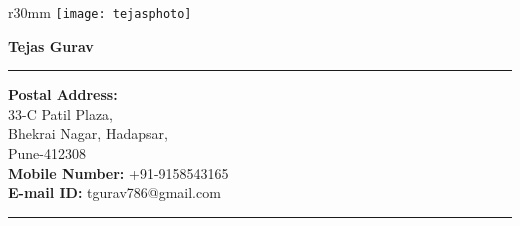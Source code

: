 \documentclass{article}
\begin{document}
	
	\begin{wrapfigure}{r}{30mm}
		\centering
		\texttt{[image: tejasphoto]} 
	\end{wrapfigure}

	\begin{center}
		\Huge \textbf{Tejas Gurav}
	\end{center}

	\rule{450pt}{2pt}
	\begin{flushleft}
		\textbf{Postal Address:}\\
		33-C Patil Plaza,\\
		Bhekrai Nagar, Hadapsar,\\
		Pune-412308\\
		\textbf{Mobile Number:} +91-9158543165\\
		\textbf{E-mail ID:} tgurav786@gmail.com	
	\end{flushleft}	
	\rule{450pt}{2pt}
	\medskip
\end{document}
